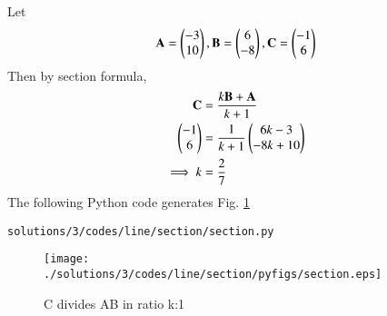 Let
\begin{align}
\mathbf{A}=\begin{pmatrix}-3\\10\end{pmatrix},
\mathbf{B}=\begin{pmatrix}6\\-8\end{pmatrix},
\mathbf{C}=\begin{pmatrix}-1\\6\end{pmatrix}
\end{align}
Then by section formula,
\begin{align}
\mathbf{C}&=\frac{k\mathbf{B}+\mathbf{A}}{k+1}
\\
\begin{pmatrix}-1\\6\end{pmatrix}&=\frac{1}{k+1}\begin{pmatrix}6k-3\\-8k+10\end{pmatrix}
\\
\implies k&=\frac{2}{7}
\end{align}
The following Python code generates Fig. \ref{fig:3.6.3_section}
%
\begin{lstlisting}
solutions/3/codes/line/section/section.py
\end{lstlisting}
\begin{figure}[!ht]
\centering
\texttt{[image: ./solutions/3/codes/line/section/pyfigs/section.eps]}
\caption{C divides AB in ratio k:1}
\label{fig:3.6.3_section}
\end{figure}

